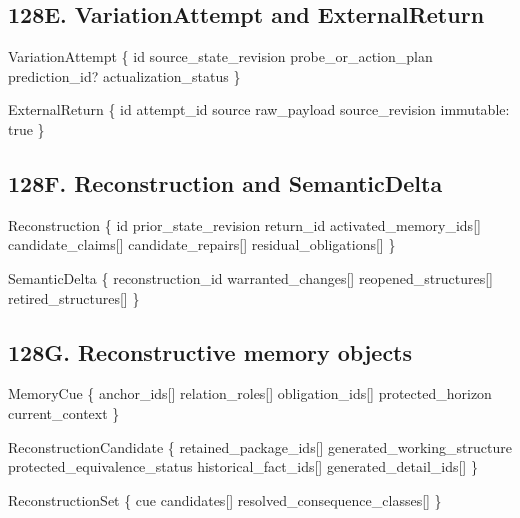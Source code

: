 \documentclass[
]{article}
\newenvironment{Shaded}{}{}
\newcommand{\NormalTok}[1]{#1}
\begin{document}
\subsection{128E. VariationAttempt and ExternalReturn}\label{variationattempt-externalreturn}

\begin{Shaded}
\begin{Highlighting}[]
\NormalTok{VariationAttempt \{}
\NormalTok{    id}
\NormalTok{    source\_state\_revision}
\NormalTok{    probe\_or\_action\_plan}
\NormalTok{    prediction\_id?}
\NormalTok{    actualization\_status}
\NormalTok{\}}

\NormalTok{ExternalReturn \{}
\NormalTok{    id}
\NormalTok{    attempt\_id}
\NormalTok{    source}
\NormalTok{    raw\_payload}
\NormalTok{    source\_revision}
\NormalTok{    immutable: true}
\NormalTok{\}}
\end{Highlighting}
\end{Shaded}

\subsection{128F. Reconstruction and SemanticDelta}\label{reconstruction-semanticdelta}

\begin{Shaded}
\begin{Highlighting}[]
\NormalTok{Reconstruction \{}
\NormalTok{    id}
\NormalTok{    prior\_state\_revision}
\NormalTok{    return\_id}
\NormalTok{    activated\_memory\_ids[]}
\NormalTok{    candidate\_claims[]}
\NormalTok{    candidate\_repairs[]}
\NormalTok{    residual\_obligations[]}
\NormalTok{\}}

\NormalTok{SemanticDelta \{}
\NormalTok{    reconstruction\_id}
\NormalTok{    warranted\_changes[]}
\NormalTok{    reopened\_structures[]}
\NormalTok{    retired\_structures[]}
\NormalTok{\}}
\end{Highlighting}
\end{Shaded}

\subsection{128G. Reconstructive memory objects}\label{reconstructive-memory-objects}

\begin{Shaded}
\begin{Highlighting}[]
\NormalTok{MemoryCue \{}
\NormalTok{    anchor\_ids[]}
\NormalTok{    relation\_roles[]}
\NormalTok{    obligation\_ids[]}
\NormalTok{    protected\_horizon}
\NormalTok{    current\_context}
\NormalTok{\}}

\NormalTok{ReconstructionCandidate \{}
\NormalTok{    retained\_package\_ids[]}
\NormalTok{    generated\_working\_structure}
\NormalTok{    protected\_equivalence\_status}
\NormalTok{    historical\_fact\_ids[]}
\NormalTok{    generated\_detail\_ids[]}
\NormalTok{\}}

\NormalTok{ReconstructionSet \{}
\NormalTok{    cue}
\NormalTok{    candidates[]}
\NormalTok{    resolved\_consequence\_classes[]}
\NormalTok{\}}
\end{Highlighting}
\end{Shaded}
\end{document}
